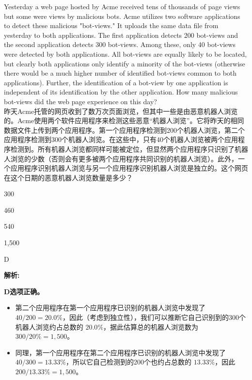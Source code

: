 \documentclass{article}
\newcounter{question} %
\newenvironment{explanation}
{\textbf{解析:}\par}
{\par}
\begin{document}



\begin{question}
    Yesterday a web page hosted by Acme received tens of thousands of page views but some were views by malicious bots. Acme utilizes two software applications to detect these malicious "bot-views." It uploads the same data file from yesterday to both applications. The first application detects 200 bot-views and the second application detects 300 bot-views. Among these, only 40 bot-views were detected by both applications. All bot-views are equally likely to be located, but clearly both applications only identify a minority of the bot-views (otherwise there would be a much higher number of identified bot-views common to both applications). Further, the identification of a bot-view by one application is independent of its identification by the other application. How many malicious bot-views did the web page experience on this day?
    \\昨天Acme托管的网页收到了数万次页面浏览，但其中一些是由恶意机器人浏览的。Acme使用两个软件应用程序来检测这些恶意“机器人浏览”。它将昨天的相同数据文件上传到两个应用程序。第一个应用程序检测到200个机器人浏览，第二个应用程序检测到300个机器人浏览。在这些中，只有40个机器人浏览被两个应用程序检测到。所有机器人浏览都同样可能被定位，但显然两个应用程序只识别了机器人浏览的少数（否则会有更多被两个应用程序共同识别的机器人浏览）。此外，一个应用程序识别机器人浏览与另一个应用程序识别机器人浏览是独立的。这个网页在这个日期的恶意机器人浏览数量是多少？
\end{question}

\begin{choices}
    \item 300
    
    \item 460
    
    \item 540
    
    \item 1,500
    
\end{choices}

\begin{correctanswer}
    D
\end{correctanswer}

\begin{explanation}
    \textbf{D选项正确。} 
    \begin{itemize}
        \item 第二个应用程序在第一个应用程序已识别的机器人浏览中发现了 $40/200 = 20.0\%$，因此（考虑到独立性），我们可以推断它自己识别到的300个机器人浏览约占总数的 $20.0\%$，据此估算总的机器人浏览数为 $300/20\% = 1,500$。
        \item 同理，第一个应用程序在第二个应用程序已识别的机器人浏览中发现了 $40/300 = 13.33\%$，所以它自己检测到的200个也约占总数的 $13.33\%$，因此 $200/13.33\% = 1,500$。
    \end{itemize}
    
\end{explanation}
\end{document}
